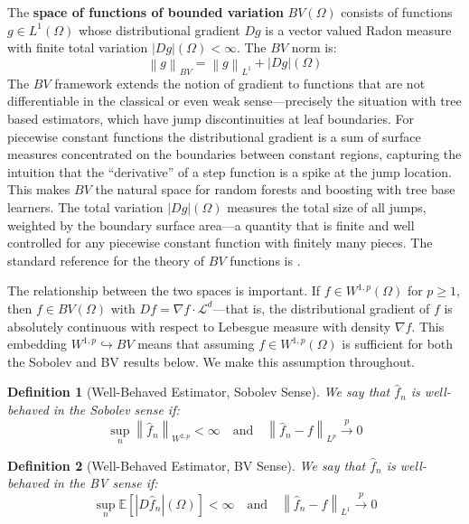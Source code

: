 \documentclass[12pt]{article}
\newtheorem{definition}{Definition}
\newcommand{\norm}[1]{\left\| #1 \right\|}
\newcommand{\E}{\mathbb{E}}
\newcommand{\Lone}{L^1(\Omega)}
\newcommand{\Wonep}{W^{1,p}(\Omega)}
\newcommand{\BV}{BV(\Omega)}
\newcommand{\fn}{\hat{f}_n}
\newcommand{\xrightarrowp}{\xrightarrow{p}}
\begin{document}
	The \textbf{space of functions of bounded variation} $\BV$ consists of functions
	$g \in \Lone$ whose distributional gradient $Dg$ is a vector valued Radon measure
	with finite total variation $|Dg|(\Omega) < \infty$. The $BV$ norm is:
	\begin{equation}
		\norm{g}_{BV} = \norm{g}_{L^1} + |Dg|(\Omega)
	\end{equation}
	The $BV$ framework extends the notion of gradient to functions that are not
	differentiable in the classical or even weak sense---precisely the situation with
	tree based estimators, which have jump discontinuities at leaf boundaries. For
	piecewise constant functions the distributional gradient is a sum of surface measures
	concentrated on the boundaries between constant regions, capturing the intuition that
	the ``derivative'' of a step function is a spike at the jump location. This makes
	$BV$ the natural space for random forests and boosting with tree base learners. The
	total variation $|Dg|(\Omega)$ measures the total size of all jumps, weighted by the
	boundary surface area---a quantity that is finite and well controlled for any
	piecewise constant function with finitely many pieces. The standard reference for
	the theory of $BV$ functions is \citet{ambrosio2000bv}.
	
	The relationship between the two spaces is important. If $f \in \Wonep$ for
	$p \geq 1$, then $f \in \BV$ with $Df = \nabla f \cdot \mathcal{L}^d$---that is,
	the distributional gradient of $f$ is absolutely continuous with respect to Lebesgue
	measure with density $\nabla f$. This embedding $W^{1,p} \hookrightarrow BV$ means
	that assuming $f \in \Wonep$ is sufficient for both the Sobolev and BV results below.
	We make this assumption throughout.
	
	\begin{definition}[Well-Behaved Estimator, Sobolev Sense]
		\label{def:wellbehaved_sobolev}
		We say that $\fn$ is \emph{well-behaved in the Sobolev sense} if:
		\begin{equation}
			\sup_n \norm{\fn}_{W^{2,p}} < \infty \quad \text{and} \quad
			\norm{\fn - f}_{L^p} \xrightarrowp 0
		\end{equation}
	\end{definition}
	
	\begin{definition}[Well-Behaved Estimator, BV Sense]
		\label{def:wellbehaved_bv}
		We say that $\fn$ is \emph{well-behaved in the BV sense} if:
		\begin{equation}
			\sup_n \E\left[|D\fn|(\Omega)\right] < \infty \quad \text{and} \quad
			\norm{\fn - f}_{L^1} \xrightarrowp 0
		\end{equation}
	\end{definition}
	
\end{document}
